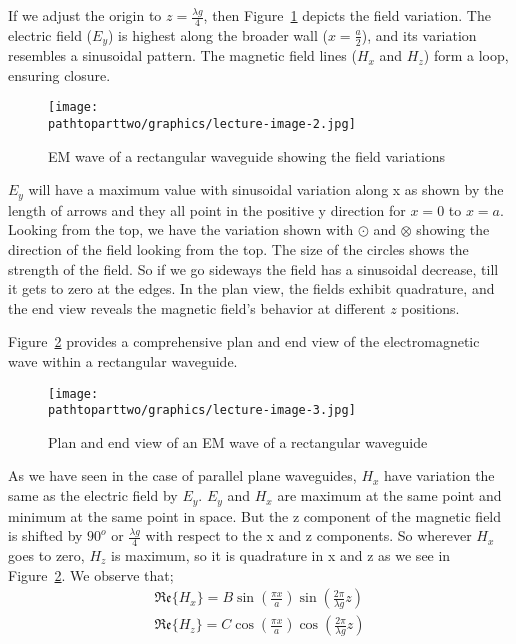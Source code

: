 If we adjust the origin to $z = \frac{\lambda g}{4}$, then Figure~\ref{fig:lectureimage2} depicts the field variation. The electric field ($E_{y}$) is highest along the broader wall ($x = \frac{a}{2}$), and its variation resembles a sinusoidal pattern. The magnetic field lines ($H_{x}$ and $H_{z}$) form a loop, ensuring closure. 
\begin{figure}[h]
\centering
\texttt{[image: \\pathtoparttwo/graphics/lecture-image-2.jpg]}
\caption{EM wave of a rectangular waveguide showing the field variations}
\label{fig:lectureimage2}
\end{figure}

$E_{y}$ will have a maximum value with sinusoidal variation along x as shown by the length of arrows and they all point in the positive y direction for $x = 0$ to $x = a$. Looking from the top, we have the variation shown with $\odot$ and $\otimes$ showing the direction of the field looking from the top. The size of the circles shows the strength of the field. So if we go sideways the field has a sinusoidal decrease, till it gets to zero at the edges. In the plan view, the fields exhibit quadrature, and the end view reveals the magnetic field's behavior at different $z$ positions.

Figure~\ref{fig:lectureimage3} provides a comprehensive plan and end view of the electromagnetic wave within a rectangular waveguide.
\begin{figure}[h]
\centering
\texttt{[image: \\pathtoparttwo/graphics/lecture-image-3.jpg]}
\caption{Plan and end view of an EM wave of a rectangular waveguide}
\label{fig:lectureimage3}
\end{figure}

As we have seen in the case of parallel plane waveguides, $H_{x}$ have variation the same as the electric field by $E_{y}$. $E_{y}$ and $H_{x}$ are maximum at the same point and minimum at the same point in space. But the z component of the magnetic field is shifted by $90^{o}$ or $\frac{\lambda g}{4}$ with respect to the x and z components. So wherever $H_{x}$ goes to zero, $H_{z}$ is maximum, so it is quadrature in x and z as we see in Figure~\ref{fig:lectureimage3}. We observe that;
\begin{align}
\mathfrak{Re}\{H_{x}\} = B\sin(\frac{\pi x}{a})\sin(\frac{2\pi}{\lambda g}z)\\
\mathfrak{Re}\{H_z\} = C\cos(\frac{\pi x}{a})\cos(\frac{2\pi}{\lambda g}z)
\end{align}

